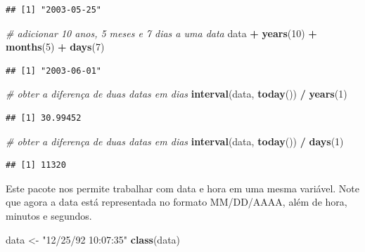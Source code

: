 \documentclass[
]{book}
\newenvironment{Shaded}{\begin{snugshade}}{\end{snugshade}}
\newcommand{\CommentTok}[1]{\textcolor[rgb]{0.56,0.35,0.01}{\textit{#1}}}
\newcommand{\DecValTok}[1]{\textcolor[rgb]{0.00,0.00,0.81}{#1}}
\newcommand{\FunctionTok}[1]{\textcolor[rgb]{0.13,0.29,0.53}{\textbf{#1}}}
\newcommand{\NormalTok}[1]{#1}
\newcommand{\OtherTok}[1]{\textcolor[rgb]{0.56,0.35,0.01}{#1}}
\newcommand{\SpecialCharTok}[1]{\textcolor[rgb]{0.81,0.36,0.00}{\textbf{#1}}}
\newcommand{\StringTok}[1]{\textcolor[rgb]{0.31,0.60,0.02}{#1}}
\begin{document}
\begin{verbatim}
## [1] "2003-05-25"
\end{verbatim}

\begin{Shaded}
\begin{Highlighting}[]
\CommentTok{\# adicionar 10 anos, 5 meses e 7 dias a uma data}
\NormalTok{data }\SpecialCharTok{+} \FunctionTok{years}\NormalTok{(}\DecValTok{10}\NormalTok{) }\SpecialCharTok{+} \FunctionTok{months}\NormalTok{(}\DecValTok{5}\NormalTok{) }\SpecialCharTok{+} \FunctionTok{days}\NormalTok{(}\DecValTok{7}\NormalTok{)}
\end{Highlighting}
\end{Shaded}

\begin{verbatim}
## [1] "2003-06-01"
\end{verbatim}

\begin{Shaded}
\begin{Highlighting}[]
\CommentTok{\# obter a diferença de duas datas em dias}
\FunctionTok{interval}\NormalTok{(data, }\FunctionTok{today}\NormalTok{()) }\SpecialCharTok{/} \FunctionTok{years}\NormalTok{(}\DecValTok{1}\NormalTok{)}
\end{Highlighting}
\end{Shaded}

\begin{verbatim}
## [1] 30.99452
\end{verbatim}

\begin{Shaded}
\begin{Highlighting}[]
\CommentTok{\# obter a diferença de duas datas em dias}
\FunctionTok{interval}\NormalTok{(data, }\FunctionTok{today}\NormalTok{()) }\SpecialCharTok{/} \FunctionTok{days}\NormalTok{(}\DecValTok{1}\NormalTok{)}
\end{Highlighting}
\end{Shaded}

\begin{verbatim}
## [1] 11320
\end{verbatim}

Este pacote nos permite trabalhar com data e hora em uma mesma variável.
Note que agora a data está representada no formato MM/DD/AAAA, além de hora, minutos e segundos.

\begin{Shaded}
\begin{Highlighting}[]
\NormalTok{data }\OtherTok{\textless{}{-}} \StringTok{"12/25/92 10:07:35"}
\FunctionTok{class}\NormalTok{(data)}
\end{Highlighting}
\end{Shaded}
\end{document}
